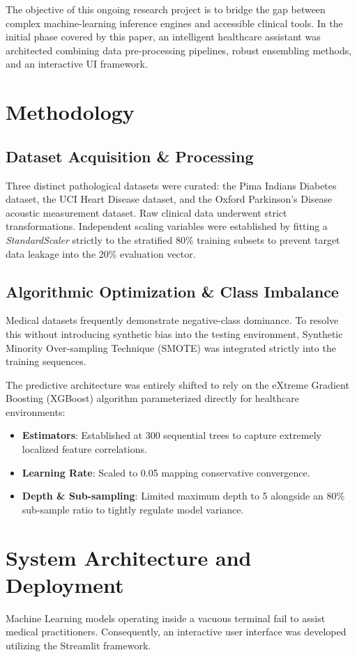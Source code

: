 \documentclass[conference]{IEEEtran}
\begin{document}
The objective of this ongoing research project is to bridge the gap between complex machine-learning inference engines and accessible clinical tools. In the initial phase covered by this paper, an intelligent healthcare assistant was architected combining data pre-processing pipelines, robust ensembling methods, and an interactive UI framework. 

\section{Methodology}

\subsection{Dataset Acquisition \& Processing}
Three distinct pathological datasets were curated: the Pima Indians Diabetes dataset, the UCI Heart Disease dataset, and the Oxford Parkinson's Disease acoustic measurement dataset. Raw clinical data underwent strict transformations. Independent scaling variables were established by fitting a \textit{StandardScaler} strictly to the stratified 80\% training subsets to prevent target data leakage into the 20\% evaluation vector.

\subsection{Algorithmic Optimization \& Class Imbalance}
Medical datasets frequently demonstrate negative-class dominance. To resolve this without introducing synthetic bias into the testing environment, Synthetic Minority Over-sampling Technique (SMOTE) was integrated strictly into the training sequences. 

The predictive architecture was entirely shifted to rely on the eXtreme Gradient Boosting (XGBoost) algorithm parameterized directly for healthcare environments:
\begin{itemize}
    \item \textbf{Estimators}: Established at 300 sequential trees to capture extremely localized feature correlations.
    \item \textbf{Learning Rate}: Scaled to 0.05 mapping conservative convergence.
    \item \textbf{Depth \& Sub-sampling}: Limited maximum depth to 5 alongside an 80\% sub-sample ratio to tightly regulate model variance.
\end{itemize}

\section{System Architecture and Deployment}
Machine Learning models operating inside a vacuous terminal fail to assist medical practitioners. Consequently, an interactive user interface was developed utilizing the Streamlit framework. 
\end{document}
